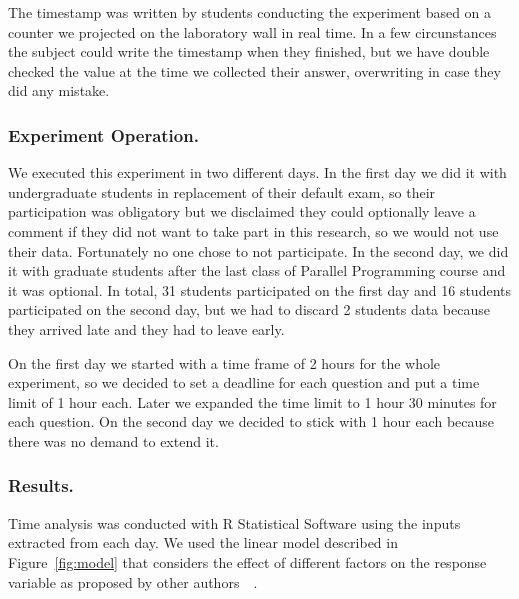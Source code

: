 The timestamp was written by students conducting the experiment based on a counter we projected on the laboratory wall in real time. In a few circunstances the subject could write the timestamp when they finished, but we have double checked the value at the time we collected their answer, overwriting in case they did any mistake.

\subsubsection{Experiment Operation.}

We executed this experiment in two different days. In the first day we did it with undergraduate students in replacement of their default exam, so their participation was obligatory but we disclaimed they could optionally leave a comment if they did not want to take part in this research, so we would not use their data. Fortunately no one chose to not participate. In the second day, we did it with graduate students after the last class of Parallel Programming course and it was optional. In total, 31 students participated on the first day and 16 students participated on the second day, but we had to discard 2 students data because they arrived late and they had to leave early.

On the first day we started with a time frame of 2 hours for the whole experiment, so we decided to set a deadline for each question and put a time limit of 1 hour each. Later we expanded the time limit to 1 hour 30 minutes for each question. On the second day we decided to stick with 1 hour each because there was no demand to extend it.

\subsubsection{Results.}

Time analysis was conducted with R Statistical Software using the inputs extracted from each day.
We used the linear model described in Figure~\ref{fig:model} that considers the effect of different factors
on the response variable as proposed by other authors~\cite{paola}~\cite{sanchez}.

